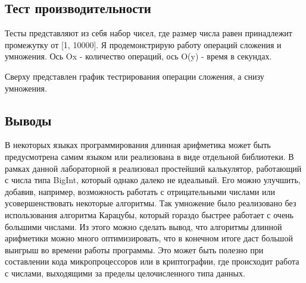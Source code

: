 \documentclass[12pt]{article}
\begin{document}
\subsection*{Тест производительности}

Тесты представляют из себя набор чисел, где размер числа равен принадлежит промежутку от [1, 10000]. Я продемонстрирую работу операций сложения и умножения. Ось Ox - количество операций, ось O(y) - время в секундах.



Сверху представлен график тестрирования операции сложения, а снизу умножения.

\subsection*{Выводы}

В некоторых языках программирования длинная арифметика может быть предусмотрена самим языком или реализована в виде отдельной библиотеки. В рамках данной лабораторной я реализовал простейший калькулятор, работающий с числа типа BigInt, который однако далеко не идеальный. Его можно улучшить, добавив, например, возможность работать с отрицательными числами или усовершенствовать некоторые алгоритмы. Так умножение было реализовано без использования алгоритма Карацубы, который гораздо быстрее работает с очень большими числами. Из этого можно сделать вывод, что алгоритмы длинной арифметики можно много оптимизировать, что в конечном итоге даст большой выигрыш во времени работы программы. Это может быть полезно при составлении кода микропроцессоров или в криптографии, где происходит работа с числами, выходящими за пределы целочисленного типа данных.
\end{document}
